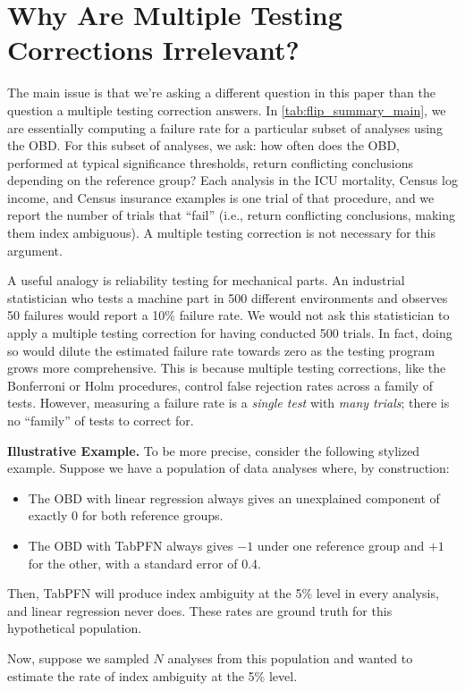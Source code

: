 \section{Why Are Multiple Testing Corrections Irrelevant?}
\label{app:multiple_testing}
The main issue is that we're asking a different question in this paper than the question a multiple testing correction answers. 
In \cref{tab:flip_summary_main}, we are essentially computing a failure rate for a particular subset of analyses using the OBD.
For this subset of analyses, we ask: how often does the OBD, performed at typical significance thresholds, return conflicting conclusions depending on the reference group? 
Each analysis in the ICU mortality, Census log income, and Census insurance examples is one trial of that procedure, and we report the number of trials that ``fail'' (i.e., return conflicting conclusions, making them index ambiguous). A multiple testing correction is not necessary for this argument.

A useful analogy is reliability testing for mechanical parts. An industrial statistician who tests a machine part in 500 different environments and observes 50 failures would report a 10\% failure rate. We would not ask this statistician to apply a multiple testing correction for having conducted 500 trials. In fact, doing so would dilute the estimated failure rate towards zero as the testing program grows more comprehensive.
This is because multiple testing corrections, like the Bonferroni or Holm procedures, control false rejection rates across a family of tests. 
However, measuring a failure rate is a \textit{single test} with \textit{many trials}; there is no ``family'' of tests to correct for.

\textbf{Illustrative Example.}
To be more precise, consider the following stylized example. Suppose we have a population of data analyses where, by construction:
\begin{itemize}
\item The OBD with linear regression always gives an unexplained component of exactly 0 for both reference groups.
\item The OBD with TabPFN always gives $-1$ under one reference group and $+1$ for the other, with a standard error of 0.4.
\end{itemize}
Then, TabPFN will produce index ambiguity at the 5\% level in every analysis, and linear regression never does.
These rates are ground truth for this hypothetical population.

Now, suppose we sampled $N$ analyses from this population and wanted to estimate the rate of index ambiguity at the 5\% level.

